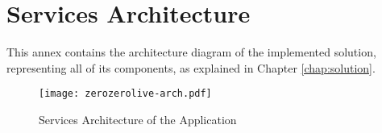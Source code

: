 \chapter{Services Architecture} \label{ap1:annex-high-level-arch}

This annex contains the architecture diagram of the implemented solution, representing all of its components, as explained in Chapter \ref{chap:solution}.

\begin{landscape}
    \begin{figure}
       \centering
        \texttt{[image: zerozerolive-arch.pdf]}
        \caption{Services Architecture of the Application}
        \label{fig:annex-high-level-arch}
    \end{figure}
    \end{landscape}


    

